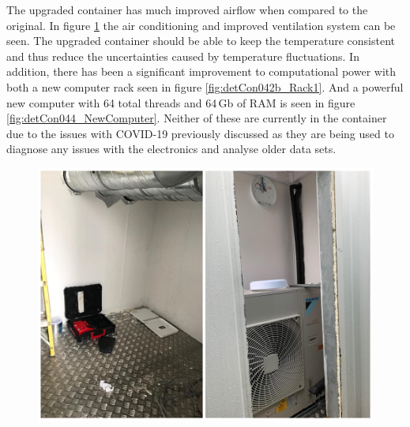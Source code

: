 The upgraded container has much improved airflow when compared to the original. 
In figure  \ref{fig:detCon035b_ContainerAirCon} the air conditioning and improved ventilation system can be seen. The upgraded container should be able to keep the temperature consistent and thus reduce the uncertainties caused by temperature fluctuations. In addition, there has been a significant improvement to computational power with both a new computer rack seen in figure \ref{fig:detCon042b_Rack1}. And a powerful new computer with 64 total threads and 64\,Gb of RAM is seen in figure \ref{fig:detCon044_NewComputer}. Neither of these are currently in the container due to the issues with COVID-19 previously discussed as they are being used to diagnose any issues with the electronics and analyse older data sets.  

\begin{figure}[htbp]
\centering
\includegraphics[width=0.7\linewidth]{Chapter3/Figs/Raster/detCon035b_ContainerAirCon.png}
\label{fig:detCon035b_ContainerAirCon}
\end{figure}



